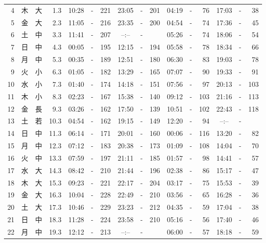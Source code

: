 \documentclass[12pt.a4j]{jsarticle}
\begin{document}
\begin{center}
\begin{table}[ht]
\begin{tabular}{|rc|cr|ccrccr|ccrccr|}
 4 & 木 & 大 &  1.3 &  10:28 &-& 221  &  23:05 &-& 201  &   04:19 &-&  76  &   17:03 &-&  38  \\
 5 & 金 & 大 &  2.3 &  11:05 &-& 216  &  23:35 &-& 200  &   04:54 &-&  74  &   17:36 &-&  45  \\
 6 & 土 & 中 &  3.3 &  11:41 &-& 207  &  --:-- &-&     &   05:26 &-&  74  &   18:06 &-&  54  \\
 7 & 日 & 中 &  4.3 &  00:05 &-& 195  &  12:15 &-& 194  &   05:58 &-&  78  &   18:34 &-&  66  \\
 8 & 月 & 中 &  5.3 &  00:35 &-& 189  &  12:51 &-& 180  &   06:30 &-&  83  &   19:03 &-&  78  \\
 9 & 火 & 小 &  6.3 &  01:05 &-& 182  &  13:29 &-& 165  &   07:07 &-&  90  &   19:33 &-&  91  \\
10 & 水 & 小 &  7.3 &  01:40 &-& 174  &  14:18 &-& 151  &   07:56 &-&  97  &   20:13 &-& 103  \\
11 & 木 & 小 &  8.3 &  02:23 &-& 167  &  15:38 &-& 140  &   09:12 &-& 103  &   21:16 &-& 113  \\
12 & 金 & 長 &  9.3 &  03:26 &-& 162  &  17:50 &-& 139  &   10:51 &-& 102  &   22:43 &-& 118  \\
13 & 土 & 若 & 10.3 &  04:54 &-& 162  &  19:15 &-& 149  &   12:20 &-&  94  &   --:-- &-&     \\
14 & 日 & 中 & 11.3 &  06:14 &-& 171  &  20:01 &-& 160  &   00:06 &-& 116  &   13:20 &-&  82  \\
15 & 月 & 中 & 12.3 &  07:12 &-& 183  &  20:38 &-& 173  &   01:09 &-& 108  &   14:04 &-&  70  \\
16 & 火 & 中 & 13.3 &  07:59 &-& 197  &  21:11 &-& 185  &   01:57 &-&  98  &   14:41 &-&  57  \\
17 & 水 & 大 & 14.3 &  08:42 &-& 210  &  21:44 &-& 196  &   02:38 &-&  86  &   15:17 &-&  47  \\
18 & 木 & 大 & 15.3 &  09:23 &-& 221  &  22:17 &-& 204  &   03:17 &-&  75  &   15:53 &-&  39  \\
19 & 金 & 大 & 16.3 &  10:04 &-& 228  &  22:49 &-& 210  &   03:56 &-&  65  &   16:28 &-&  36  \\
20 & 土 & 大 & 17.3 &  10:46 &-& 229  &  23:23 &-& 212  &   04:35 &-&  59  &   17:04 &-&  38  \\
21 & 日 & 中 & 18.3 &  11:28 &-& 224  &  23:58 &-& 210  &   05:16 &-&  56  &   17:40 &-&  46  \\
22 & 月 & 中 & 19.3 &  12:12 &-& 213  &  --:-- &-&     &   06:00 &-&  57  &   18:18 &-&  59  \\

\end{tabular}
\end{table}
\end{center}
\end{document}
